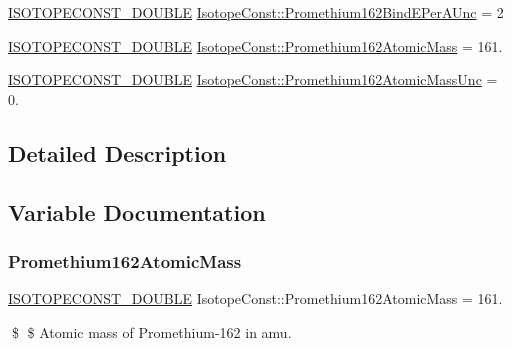 \begin{DoxyCompactItemize}
\mbox{\hyperlink{group___isotope_const-_macros_ga8f45a7272ce02c0b4c65c44636ed719a}{I\+S\+O\+T\+O\+P\+E\+C\+O\+N\+S\+T\+\_\+\+D\+O\+U\+B\+LE}} \mbox{\hyperlink{group___isotope_const-_promethium-_pm162_ga34b8c71d88767fcc0d5dc50bc588b6a8}{Isotope\+Const\+::\+Promethium162\+Bind\+E\+Per\+A\+Unc}} = 2
\item 
\mbox{\hyperlink{group___isotope_const-_macros_ga8f45a7272ce02c0b4c65c44636ed719a}{I\+S\+O\+T\+O\+P\+E\+C\+O\+N\+S\+T\+\_\+\+D\+O\+U\+B\+LE}} \mbox{\hyperlink{group___isotope_const-_promethium-_pm162_gacd9cf70fb11f9ce85346571814bcfb31}{Isotope\+Const\+::\+Promethium162\+Atomic\+Mass}} = 161.
\item 
\mbox{\hyperlink{group___isotope_const-_macros_ga8f45a7272ce02c0b4c65c44636ed719a}{I\+S\+O\+T\+O\+P\+E\+C\+O\+N\+S\+T\+\_\+\+D\+O\+U\+B\+LE}} \mbox{\hyperlink{group___isotope_const-_promethium-_pm162_ga1afe78d6a0dad97fa5dd1085c8834de8}{Isotope\+Const\+::\+Promethium162\+Atomic\+Mass\+Unc}} = 0.
\end{DoxyCompactItemize}


\subsection{Detailed Description}


\subsection{Variable Documentation}
\mbox{\label{group___isotope_const-_promethium-_pm162_gacd9cf70fb11f9ce85346571814bcfb31}} 
\subsubsection{\texorpdfstring{Promethium162\+Atomic\+Mass}{Promethium162AtomicMass}}
{\footnotesize\ttfamily \mbox{\hyperlink{group___isotope_const-_macros_ga8f45a7272ce02c0b4c65c44636ed719a}{I\+S\+O\+T\+O\+P\+E\+C\+O\+N\+S\+T\+\_\+\+D\+O\+U\+B\+LE}} Isotope\+Const\+::\+Promethium162\+Atomic\+Mass = 161.}

\$ \$ Atomic mass of Promethium-\/162 in amu. \mbox{\label{group___isotope_const-_promethium-_pm162_ga1afe78d6a0dad97fa5dd1085c8834de8}} 
